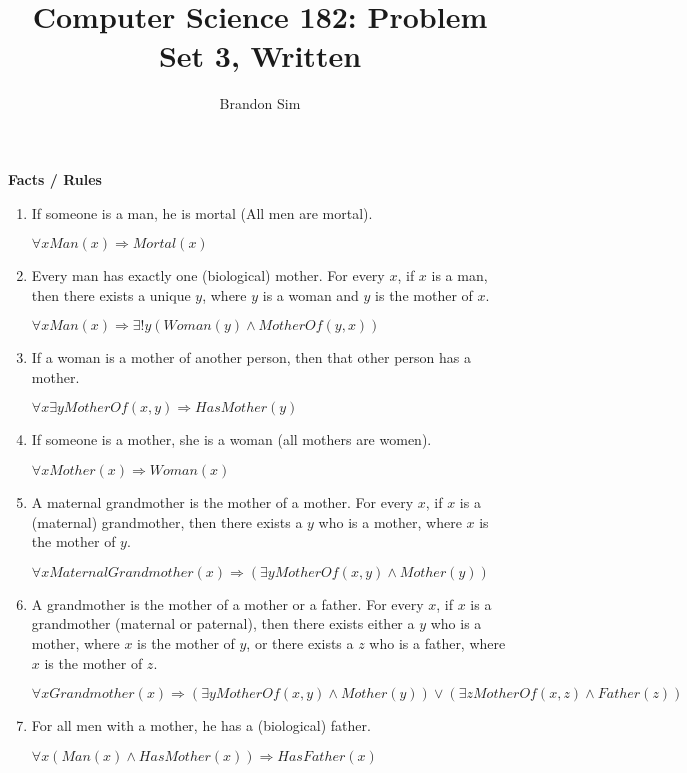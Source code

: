 \documentclass[12pt]{article}
\begin{document}
\title{Computer Science 182: Problem Set 3, Written}
\author{Brandon Sim}

\maketitle

\textbf{Facts / Rules}
\begin{enumerate}
\item If someone is a man, he is mortal (All men are mortal).

$\forall x Man(x) \Rightarrow Mortal(x)$

\item Every man has exactly one (biological) mother. For every $x$, if $x$ is a man, then there exists a unique $y$, where $y$ is a woman and $y$ is the mother of $x$.

$\forall x Man(x) \Rightarrow \exists! y (Woman(y) \land MotherOf(y, x))$

\item If a woman is a mother of another person, then that other person has a mother.

$\forall x \exists y MotherOf(x, y) \Rightarrow HasMother(y)$

\item If someone is a mother, she is a woman (all mothers are women).

$\forall x Mother(x) \Rightarrow Woman(x)$

\item A maternal grandmother is the mother of a mother. For every $x$, if $x$ is a (maternal) grandmother, then there exists a $y$ who is a mother, where $x$ is the mother of $y$.

$\forall x MaternalGrandmother(x) \Rightarrow (\exists y MotherOf(x, y) \land Mother(y))$

\item A grandmother is the mother of a mother or a father. For every $x$, if $x$ is a grandmother (maternal or paternal), then there exists either a $y$ who is a mother, where $x$ is the mother of $y$, or there exists a $z$ who is a father, where $x$ is the mother of $z$.

$\forall x Grandmother(x) \Rightarrow (\exists y MotherOf(x,y) \land Mother(y)) \lor (\exists z MotherOf(x,z) \land Father(z))$

\item For all men with a mother, he has a (biological) father.

$\forall x (Man(x) \land HasMother(x)) \Rightarrow HasFather(x)$ 


\end{enumerate}
\end{document}
